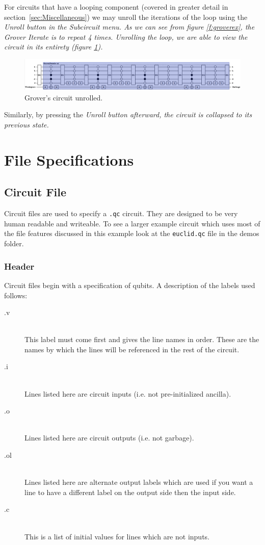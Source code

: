 \documentclass[10pt]{article}
\theoremstyle{definition}
\begin{document}
For circuits that have a looping component (covered in greater detail in section~\ref{sec:Miscellaneous}) we may unroll the iterations of the loop using the \em Unroll \em button in the \em Subcircuit \em menu. As we can see from figure \ref{f:groverex}, the Grover Iterate is to repeat 4 times. Unrolling the loop, we are able to view the circuit in its entirety (figure \ref{f:groverunroll}).

\begin{figure}
\capstart
\centering
\includegraphics[width=170mm]{Figures/SubCircuits/GroverCircuitUnroll}
\caption{Grover's circuit unrolled.}
\label{f:groverunroll}
\end{figure}

Similarly, by pressing the \em Unroll \em button afterward, the circuit is collapsed to its previous state. 

\section{File Specifications}

\subsection{Circuit File}
Circuit files are used to specify a \verb+.qc+ circuit. They are designed to be very human readable and
writeable.  To see a larger example circuit which uses most of the file features discussed in this example
look at the \verb+euclid.qc+ file in the demos folder.

\subsubsection{Header}
Circuit files begin with a specification of qubits. A description of the labels used follows:
\begin{description}
\item[.v] \hfill \\
This label must come first and gives the line names in order.  These are the names by which the lines
will be referenced in the rest of the circuit.
\item[.i] \hfill \\
Lines listed here are circuit inputs (i.e. not pre-initialized ancilla).
\item[.o] \hfill \\
Lines listed here are circuit outputs (i.e. not garbage).
\item[.ol] \hfill \\
Lines listed here are alternate output labels which are used if you want a 
line to have a different label on the output side then the input side.
\item[.c] \hfill \\
This is a list of initial values for lines which are not inputs.
\end{description}
\end{document}
